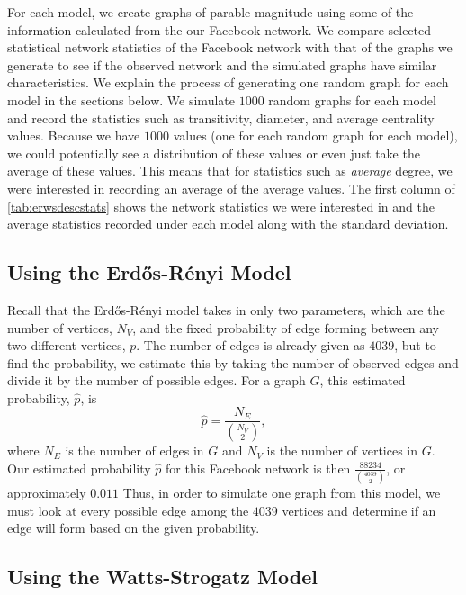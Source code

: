 \documentclass[12pt,twoside]{amherstthesis}
\begin{document}
  For each model, we create graphs of parable magnitude using some of the
  information calculated from the our Facebook network. We compare
  selected statistical network statistics of the Facebook network with
  that of the graphs we generate to see if the observed network and the
  simulated graphs have similar characteristics. We explain the process of
  generating one random graph for each model in the sections below. We
  simulate \(1000\) random graphs for each model and record the statistics
  such as transitivity, diameter, and average centrality values. Because
  we have \(1000\) values (one for each random graph for each model), we
  could potentially see a distribution of these values or even just take
  the average of these values. This means that for statistics such as
  \emph{average} degree, we were interested in recording an average of the
  average values. The first column of \autoref{tab:erwsdescstats} shows
  the network statistics we were interested in and the average statistics
  recorded under each model along with the standard deviation.
  
  \subsection{Using the Erdős-Rényi
  Model}\label{using-the-erdos-renyi-model}
  
  Recall that the Erdős-Rényi model takes in only two parameters, which
  are the number of vertices, \(N_{V}\), and the fixed probability of edge
  forming between any two different vertices, \(p\). The number of edges
  is already given as \(4039\), but to find the probability, we estimate
  this by taking the number of observed edges and divide it by the number
  of possible edges. For a graph \(G\), this estimated probability,
  \(\hat{p}\), is \[\hat{p} = \frac {N_{E}} {{N_{V} \choose 2}},\] where
  \(N_{E}\) is the number of edges in \(G\) and \(N_{V}\) is the number of
  vertices in \(G\). Our estimated probability \(\hat{p}\) for this
  Facebook network is then \(\frac {88234} {{4039 \choose 2}}\), or
  approximately \(0.011\) Thus, in order to simulate one graph from this
  model, we must look at every possible edge among the \(4039\) vertices
  and determine if an edge will form based on the given probability.
  
  \subsection{Using the Watts-Strogatz
  Model}\label{using-the-watts-strogatz-model}
  
\end{document}
